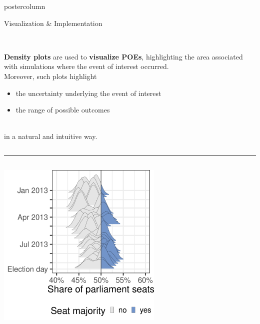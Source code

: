 \documentclass[final,hyperref={pdfpagelabels=false}]{beamer}
\let\olditem\item
\renewcommand\item{\justifying\olditem} %
\newcommand{\darkgray}[1]{\textcolor{koaladarkgray}{#1}}
\begin{document}
\begin{frame}
\begin{columns}
\begin{column}{1\textwidth}
\begin{columns}[T]
\begin{column}{.484\textwidth}
\begin{beamercolorbox}[center,wd=\textwidth]{postercolumn}
\begin{minipage}[T]{.95\textwidth}
\begin{block}{\footnotesize Visualization \& Implementation}
\begin{columns}[t]
  \begin{column}{.6\textwidth}
  \ \\
  \darkgray{\textbf{Density plots}} are used to \darkgray{\textbf{visualize POEs}}, highlighting the area
  associated with simulations where the event of interest occurred. \\
  Moreover, such plots highlight
  \begin{minipage}{\textwidth}
  \hspace{0.5in}
  \begin{itemize}
    \item the uncertainty underlying the event of interest
    \item the range of possible outcomes
  \end{itemize}
  \end{minipage}
  \\[20px]
  in a natural and intuitive way.
  \end{column}
\end{columns}
\vspace{1ex}
\textcolor{LMUlightgray}{\hrule{}}
\vspace{1ex}
\begin{columns}[t]
  \begin{column}{.35\textwidth}
  \begin{center}\centering
  \includegraphics[width=300px]{figures/vis_seatDist_time}
  \end{center}
  \end{column}

  \hspace{-1.5ex}
  \textcolor{LMUlightgray}{\vrule{}}
  \hspace{1.5ex}


\end{columns}
\end{block}
\end{minipage}
\end{beamercolorbox}
\end{column}
\end{columns}
\end{column}
\end{columns}
\end{frame}
\end{document}
